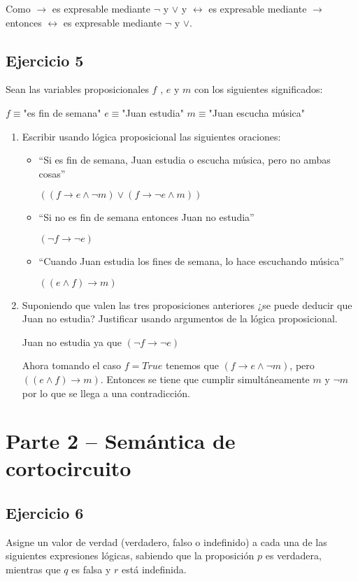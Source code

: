 \documentclass[10pt,a4paper]{article}
\begin{document}
Como $\rightarrow$ es expresable mediante $\neg$ y $\vee$ y $\leftrightarrow$ es expresable mediante $\rightarrow$ entonces $\leftrightarrow$ es expresable mediante $\neg$ y $\vee$.

\subsection*{Ejercicio 5}
Sean las variables proposicionales $f$ , $e$ y $m$ con los siguientes significados:

$f \equiv$"es fin de semana"
$e \equiv$"Juan estudia"
$m \equiv$"Juan escucha música"
\begin{enumerate}
\item Escribir usando lógica proposicional las siguientes oraciones:

\begin{itemize}
\item “Si es fin de semana, Juan estudia o escucha música, pero no ambas cosas”

$((f \rightarrow e \wedge \neg m) \vee (f\rightarrow \neg e \wedge m))$

\item “Si no es fin de semana entonces Juan no estudia”

$(\neg f \rightarrow \neg e)$

\item “Cuando Juan estudia los fines de semana, lo hace escuchando música”

$((e \wedge f) \rightarrow m)$

\end{itemize}

\item Suponiendo que valen las tres proposiciones anteriores ¿se puede deducir que Juan no estudia? Justificar usando argumentos de la lógica proposicional.

Juan no estudia ya que $(\neg f \rightarrow \neg e)$

Ahora tomando el caso $f=True$ tenemos que $(f \rightarrow e \wedge \neg m)$, pero $((e \wedge f) \rightarrow m)$. Entonces se tiene que cumplir simultáneamente $m$ y $\neg m$ por lo que se llega a una contradicción.

\end{enumerate}

\section*{Parte 2 – Semántica de cortocircuito}
\subsection*{Ejercicio 6}
Asigne un valor de verdad (verdadero, falso o indefinido) a cada una de las siguientes expresiones lógicas, sabiendo que la proposición $p$ es verdadera, mientras que $q$ es falsa y $r$ está indefinida.
\end{document}
